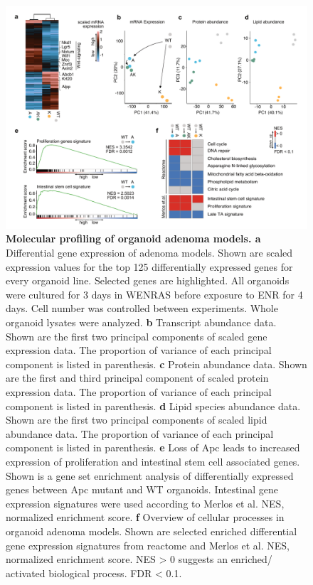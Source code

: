 \begin{flushleft}
\begin{figure}[H]
\centering
\includegraphics[width=\textwidth,
                height=\textheight,
                keepaspectratio]{figures/adenomaprofiling/pdf/fig_1_6_1.pdf}
\caption{\textbf{Molecular profiling of organoid adenoma models. a} Differential gene expression of adenoma models. Shown are scaled expression values for the top 125 differentially expressed genes for every organoid line. Selected genes are highlighted. All organoids were cultured for 3 days in WENRAS before exposure to ENR for 4 days. Cell number was controlled between experiments. Whole organoid lysates were analyzed. 
\textbf{b} Transcript abundance data. Shown are the first two principal components of scaled gene expression data. The proportion of variance of each principal component is listed in parenthesis. 
\textbf{c} Protein abundance data. Shown are the first and third principal component of scaled protein expression data. The proportion of variance of each principal component is listed in parenthesis. 
\textbf{d} Lipid species abundance data. Shown are the first two principal components of scaled lipid abundance data. The proportion of variance of each principal component is listed in parenthesis. 
\textbf{e} Loss of Apc leads to increased expression of proliferation and intestinal stem cell associated genes. Shown is a gene set enrichment analysis of differentially expressed genes between Apc mutant and WT organoids. Intestinal gene expression signatures were used according to Merlos et al. NES, normalized enrichment score. 
\textbf{f} Overview of cellular processes in organoid adenoma models. Shown are selected enriched differential gene expression signatures from reactome and Merlos et al. NES, normalized enrichment score. NES > 0 suggests an enriched/ activated biological process. FDR < 0.1.}
\label{fig_161}
\end{figure}
\bigbreak



\end{flushleft}
